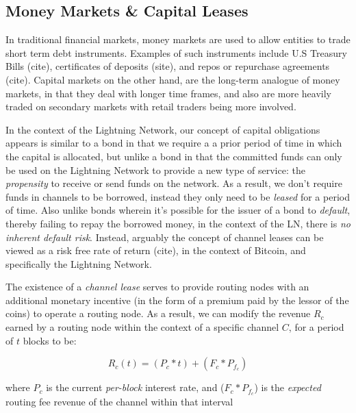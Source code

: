 \documentclass[12pt,a4paper]{article}
\theoremstyle{definition}
\begin{document}

\subsection{Money Markets \& Capital Leases} %

In traditional financial markets, money markets are used to allow entities to
trade short term debt instruments. Examples of such instruments include U.S
Treasury Bills (cite), certificates of deposits (site), and repos or repurchase
agreements (cite). Capital markets on the other hand, are the long-term
analogue of money markets, in that they deal with longer time frames, and also
are more heavily traded on secondary markets with retail traders being more
involved.

In the context of the Lightning Network, our concept of capital obligations
appears is similar to a bond in that we require a a prior period of time in
which the capital is allocated, but unlike a bond in that the committed funds
can only be used on the Lightning Network to provide a new type of service: the
\emph{propensity} to receive or send funds on the network. As a result, we
don't require funds in channels to be borrowed, instead they only need to be
\emph{leased} for a period of time. Also unlike bonds wherein it's possible for
the issuer of a bond to \emph{default}, thereby failing to repay the borrowed
money, in the context of the LN, there is \emph{no inherent default risk}.
Instead, arguably the concept of channel leases can be viewed as a risk free
rate of return (cite), in the context of Bitcoin, and specifically the
Lightning Network.

The existence of a \emph{channel lease} serves to provide routing nodes with an
additional monetary incentive (in the form of a premium paid by the lessor of
the coins) to operate a routing node. As a result, we can modify the revenue
$R_c$ earned by a routing node within the context of a specific channel $C$,
for a period of $t$ blocks to be:

\begin{equation}
R_c(t) = (P_c * t) + (F_c* P_{f_c}) %
\end{equation}

where $P_c$ is the current \emph{per-block} interest rate, and ($F_c *
P_{f_c}$) is the \emph{expected} routing fee revenue of the channel within that
interval \\
\end{document}
